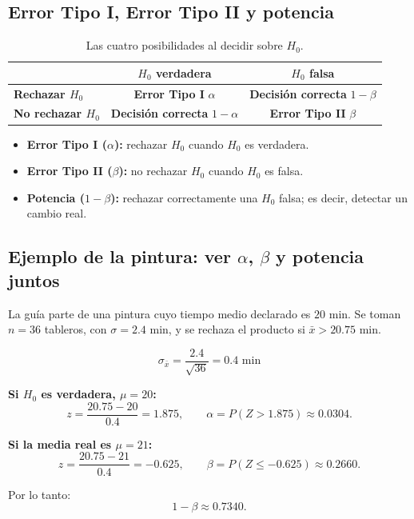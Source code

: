 \documentclass[11pt,a4paper]{article}
\begin{document}
\subsection{Error Tipo I, Error Tipo II y potencia}

\begin{table}[H]
\centering
\renewcommand{\arraystretch}{1.35}
\begin{tabular}{p{3.6cm}cc}
\toprule
 & \textbf{$H_0$ verdadera} & \textbf{$H_0$ falsa}\\
\midrule
\textbf{Rechazar $H_0$} & \cellcolor{rejectred!16}\textbf{Error Tipo I} $\alpha$ & \cellcolor{accentgreen!14}\textbf{Decisión correcta} $1-\beta$\\
\textbf{No rechazar $H_0$} & \cellcolor{acceptblue!12}\textbf{Decisión correcta} $1-\alpha$ & \cellcolor{altorange!16}\textbf{Error Tipo II} $\beta$\\
\bottomrule
\end{tabular}
\caption{Las cuatro posibilidades al decidir sobre $H_0$.}
\end{table}

\begin{itemize}
\item \textbf{Error Tipo I ($\alpha$):} rechazar $H_0$ cuando $H_0$ es verdadera.
\item \textbf{Error Tipo II ($\beta$):} no rechazar $H_0$ cuando $H_0$ es falsa.
\item \textbf{Potencia ($1-\beta$):} rechazar correctamente una $H_0$ falsa; es decir, detectar un cambio real.
\end{itemize}

\subsection{Ejemplo de la pintura: ver $\alpha$, $\beta$ y potencia juntos}

La guía parte de una pintura cuyo tiempo medio declarado es $20$ min. Se toman $n=36$ tableros, con $\sigma=2.4$ min, y se rechaza el producto si $\bar{x}>20.75$ min.

\[
\sigma_{\bar{x}}=\frac{2.4}{\sqrt{36}}=0.4\text{ min}
\]

\textbf{Si $H_0$ es verdadera, $\mu=20$:}
\[
z=\frac{20.75-20}{0.4}=1.875,
\qquad
\alpha=P(Z>1.875)\approx0.0304.
\]

\textbf{Si la media real es $\mu=21$:}
\[
z=\frac{20.75-21}{0.4}=-0.625,
\qquad
\beta=P(Z\le-0.625)\approx0.2660.
\]

Por lo tanto:
\[
1-\beta\approx0.7340.
\]
\end{document}
